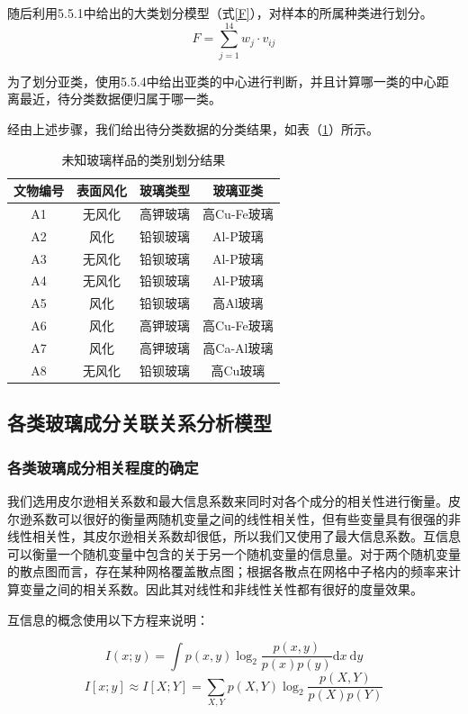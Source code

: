 \documentclass{my_paper}
\begin{document}
随后利用5.5.1中给出的大类划分模型（式\ref{F}），对样本的所属种类进行划分。
$$F = \sum\limits_{j=1}^{14} w_j \cdot v_{ij}$$

为了划分亚类，使用5.5.4中给出亚类的中心进行判断，并且计算哪一类的中心距离最近，待分类数据便归属于哪一类。

经由上述步骤，我们给出待分类数据的分类结果，如表（\ref{class}）所示。

\begin{longtable}{cccc}
  \caption{未知玻璃样品的类别划分结果}
  \label{class} \\
  \toprule
  文物编号 & 表面风化 & 玻璃类型 & 玻璃亚类     \\\midrule
  A1   & 无风化  & 高钾玻璃 & 高Cu-Fe玻璃 \\
  A2   & 风化   & 铅钡玻璃 & Al-P玻璃   \\
  A3   & 无风化  & 铅钡玻璃 & Al-P玻璃   \\
  A4   & 无风化  & 铅钡玻璃 & Al-P玻璃   \\
  A5   & 风化   & 铅钡玻璃 & 高Al玻璃    \\
  A6   & 风化   & 高钾玻璃 & 高Cu-Fe玻璃  \\
  A7   & 风化   & 高钾玻璃 & 高Ca-Al玻璃  \\
  A8   & 无风化  & 铅钡玻璃 & 高Cu玻璃    \\
  \bottomrule
  \end{longtable}  

\subsection{各类玻璃成分关联关系分析模型}
\subsubsection{各类玻璃成分相关程度的确定}
我们选用皮尔逊相关系数和最大信息系数来同时对各个成分的相关性进行衡量。皮尔逊系数可以很好的衡量两随机变量之间的线性相关性，但有些变量具有很强的非线性相关性，其皮尔逊相关系数却很低，所以我们又使用了最大信息系数。互信息可以衡量一个随机变量中包含的关于另一个随机变量的信息量。对于两个随机变量的散点图而言，存在某种网格覆盖散点图；根据各散点在网格中子格内的频率来计算变量之间的相关系数。因此其对线性和非线性关性都有很好的度量效果。

互信息\cite{13}的概念使用以下方程来说明：

$$I(x ; y)=\int p(x, y) \log _{2} \frac{p(x, y)}{p(x) p(y)} \mathrm{d} x \mathrm{~d} y$$
$$ I[x ; y] \approx I[X ; Y]=\sum_{X, Y} p(X, Y) \log _{2} \frac{p(X, Y)}{p(X) p(Y)}$$
\end{document}
